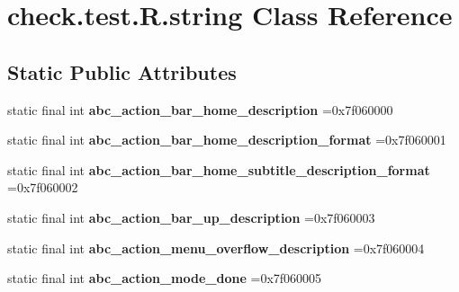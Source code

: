 \hypertarget{classcheck_1_1test_1_1_r_1_1string}{}\section{check.\+test.\+R.\+string Class Reference}
\label{classcheck_1_1test_1_1_r_1_1string}
\subsection*{Static Public Attributes}
\begin{DoxyCompactItemize}
\item 
\hypertarget{classcheck_1_1test_1_1_r_1_1string_a86e5d90ea8e8a49edb01af69da14c227}{}static final int {\bfseries abc\+\_\+action\+\_\+bar\+\_\+home\+\_\+description} =0x7f060000\label{classcheck_1_1test_1_1_r_1_1string_a86e5d90ea8e8a49edb01af69da14c227}

\item 
\hypertarget{classcheck_1_1test_1_1_r_1_1string_ab1f3342cbdaf9c8523440026d20f3264}{}static final int {\bfseries abc\+\_\+action\+\_\+bar\+\_\+home\+\_\+description\+\_\+format} =0x7f060001\label{classcheck_1_1test_1_1_r_1_1string_ab1f3342cbdaf9c8523440026d20f3264}

\item 
\hypertarget{classcheck_1_1test_1_1_r_1_1string_a7c31eb39813022b70740c17d1be810bb}{}static final int {\bfseries abc\+\_\+action\+\_\+bar\+\_\+home\+\_\+subtitle\+\_\+description\+\_\+format} =0x7f060002\label{classcheck_1_1test_1_1_r_1_1string_a7c31eb39813022b70740c17d1be810bb}

\item 
\hypertarget{classcheck_1_1test_1_1_r_1_1string_a06a09eb74b35a504e4b3ea6f401f85ec}{}static final int {\bfseries abc\+\_\+action\+\_\+bar\+\_\+up\+\_\+description} =0x7f060003\label{classcheck_1_1test_1_1_r_1_1string_a06a09eb74b35a504e4b3ea6f401f85ec}

\item 
\hypertarget{classcheck_1_1test_1_1_r_1_1string_aa65b86e148da12aada0eb00abde6b9d7}{}static final int {\bfseries abc\+\_\+action\+\_\+menu\+\_\+overflow\+\_\+description} =0x7f060004\label{classcheck_1_1test_1_1_r_1_1string_aa65b86e148da12aada0eb00abde6b9d7}

\item 
\hypertarget{classcheck_1_1test_1_1_r_1_1string_aad942d227094ee9555b1f092374ed08d}{}static final int {\bfseries abc\+\_\+action\+\_\+mode\+\_\+done} =0x7f060005\label{classcheck_1_1test_1_1_r_1_1string_aad942d227094ee9555b1f092374ed08d}


\end{DoxyCompactItemize}
